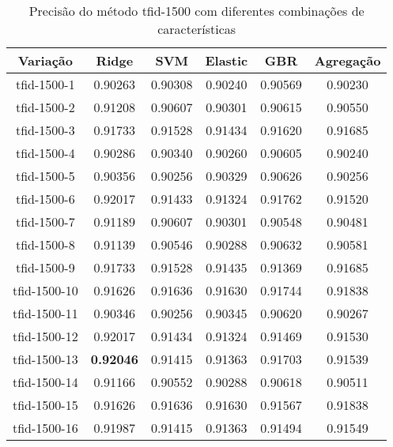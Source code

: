 \begin{table}[H]
\centering
\begin{tabular}{|c| c c  c  c  c| }
\hline
Variação &  Ridge & SVM & Elastic & GBR & Agregação  \\ 
\hline
tfid-1500-1 & 0.90263 & 0.90308 & 0.90240 & 0.90569 & 0.90230 \\
\hline
tfid-1500-2 & 0.91208 & 0.90607 & 0.90301 & 0.90615 & 0.90550 \\
\hline
tfid-1500-3 & 0.91733 & 0.91528 & 0.91434 & 0.91620 & 0.91685 \\
\hline
tfid-1500-4 & 0.90286 & 0.90340 & 0.90260 & 0.90605 & 0.90240 \\
\hline
tfid-1500-5 & 0.90356 & 0.90256 & 0.90329 & 0.90626 & 0.90256 \\
\hline
tfid-1500-6 & 0.92017 & 0.91433 & 0.91324 & 0.91762 & 0.91520 \\
\hline
tfid-1500-7 & 0.91189 & 0.90607 & 0.90301 & 0.90548 & 0.90481 \\
\hline
tfid-1500-8 & 0.91139 & 0.90546 & 0.90288 & 0.90632 & 0.90581 \\
\hline
tfid-1500-9 & 0.91733 & 0.91528 & 0.91435 & 0.91369 & 0.91685 \\
\hline
tfid-1500-10 & 0.91626 & 0.91636 & 0.91630 & 0.91744 & 0.91838 \\
\hline
tfid-1500-11 & 0.90346 & 0.90256 & 0.90345 & 0.90620 & 0.90267 \\
\hline
tfid-1500-12 & 0.92017 & 0.91434 & 0.91324 & 0.91469 & 0.91530 \\
\hline
tfid-1500-13 & \textbf{0.92046} & 0.91415 & 0.91363 & 0.91703 & 0.91539 \\
\hline
tfid-1500-14 & 0.91166 & 0.90552 & 0.90288 & 0.90618 & 0.90511 \\
\hline
tfid-1500-15 & 0.91626 & 0.91636 & 0.91630 & 0.91567 & 0.91838 \\
\hline
tfid-1500-16 & 0.91987 & 0.91415 & 0.91363 & 0.91494 & 0.91549 \\
\hline
\end{tabular}
\caption{Precisão do método tfid-1500 com diferentes combinações de características}
\label{tab:precisiontfid1500}
\end{table}

